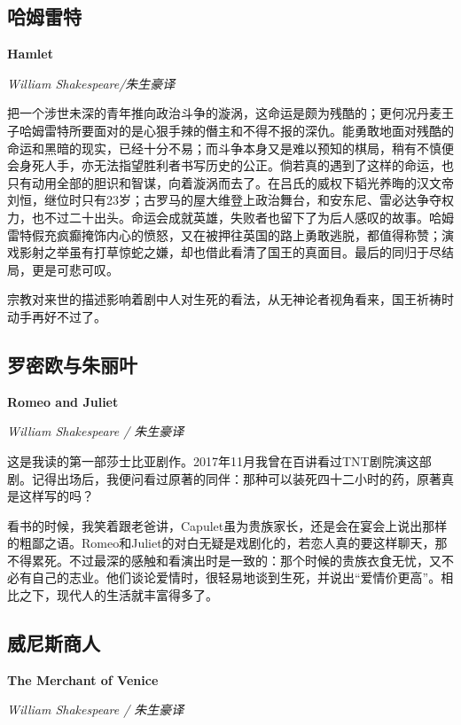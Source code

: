 \subsection*{哈姆雷特}
\par \textbf{Hamlet}
\par \emph{William Shakespeare/朱生豪译}
\par 把一个涉世未深的青年推向政治斗争的漩涡，这命运是颇为残酷的；更何况丹麦王子哈姆雷特所要面对的是心狠手辣的僭主和不得不报的深仇。能勇敢地面对残酷的命运和黑暗的现实，已经十分不易；而斗争本身又是难以预知的棋局，稍有不慎便会身死人手，亦无法指望胜利者书写历史的公正。倘若真的遇到了这样的命运，也只有动用全部的胆识和智谋，向着漩涡而去了。在吕氏的威权下韬光养晦的汉文帝刘恒，继位时只有23岁；古罗马的屋大维登上政治舞台，和安东尼、雷必达争夺权力，也不过二十出头。命运会成就英雄，失败者也留下了为后人感叹的故事。哈姆雷特假充疯癫掩饰内心的愤怒，又在被押往英国的路上勇敢逃脱，都值得称赞；演戏影射之举虽有打草惊蛇之嫌，却也借此看清了国王的真面目。最后的同归于尽结局，更是可悲可叹。
\par 宗教对来世的描述影响着剧中人对生死的看法，从无神论者视角看来，国王祈祷时动手再好不过了。
\par {}

\subsection*{罗密欧与朱丽叶}
\par \textbf{Romeo and Juliet}
\par \emph{William Shakespeare / 朱生豪译} 
\par 这是我读的第一部莎士比亚剧作。2017年11月我曾在百讲看过TNT剧院演这部剧。记得出场后，我便问看过原著的同伴：那种可以装死四十二小时的药，原著真是这样写的吗？
\par 看书的时候，我笑着跟老爸讲，Capulet虽为贵族家长，还是会在宴会上说出那样的粗鄙之语。Romeo和Juliet的对白无疑是戏剧化的，若恋人真的要这样聊天，那不得累死。不过最深的感触和看演出时是一致的：那个时候的贵族衣食无忧，又不必有自己的志业。他们谈论爱情时，很轻易地谈到生死，并说出“爱情价更高”。相比之下，现代人的生活就丰富得多了。
\par {}

\subsection*{威尼斯商人}
\par \textbf{The Merchant of Venice}
\par \emph{William Shakespeare / 朱生豪译} 

